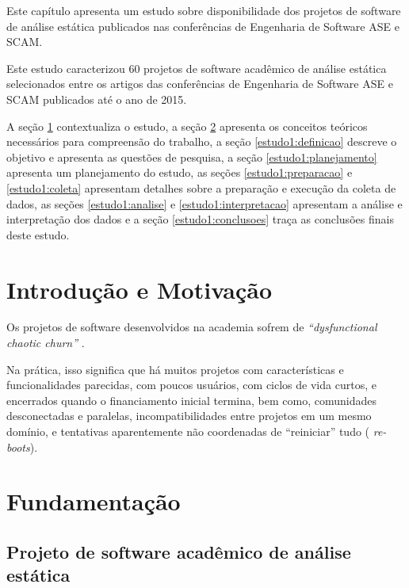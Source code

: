 {Este capítulo apresenta um estudo sobre disponibilidade dos projetos de
software de análise estática publicados nas conferências de Engenharia de
Software ASE e SCAM.}

Este estudo caracterizou 60 projetos de software acadêmico de análise estática
selecionados entre os artigos das conferências de Engenharia de Software ASE e
SCAM publicados até o ano de 2015.

A seção \ref{estudo1:introducao} contextualiza o estudo,
a seção \ref{estudo1:fundamentacao} apresenta os conceitos teóricos necessários para compreensão do trabalho,
a seção \ref{estudo1:definicao} descreve o objetivo e apresenta as questões de pesquisa,
a seção \ref{estudo1:planejamento} apresenta um planejamento do estudo,
as seções \ref{estudo1:preparacao} e \ref{estudo1:coleta} apresentam detalhes sobre a preparação e execução da coleta de dados,
as seções \ref{estudo1:analise} e \ref{estudo1:interpretacao} apresentam a análise e interpretação dos dados e
a seção \ref{estudo1:conclusoes} traça as conclusões finais deste estudo.

\section{Introdução e Motivação} \label{estudo1:introducao} %

Os projetos de software desenvolvidos na academia sofrem de {\it
``dysfunctional chaotic churn''} \cite{howison2015understanding}.

Na prática, isso significa que há muitos projetos com características e
funcionalidades parecidas, com poucos usuários, com ciclos de vida curtos, e
encerrados quando o financiamento inicial termina, bem como, comunidades
desconectadas e paralelas, incompatibilidades entre projetos em um mesmo
domínio, e tentativas aparentemente não coordenadas de ``reiniciar'' tudo ({\it
re-boots}).


\section{Fundamentação} \label{estudo1:fundamentacao} %

\subsection{Projeto de software acadêmico de análise estática}


